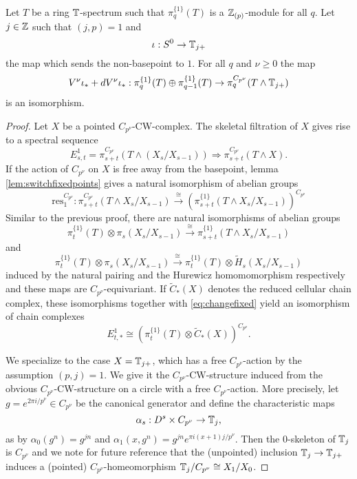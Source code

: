 \begin{lem}
Let $T$ be a ring $\mathbb{T}$-spectrum such that $\pi_q^{\{1\}}(T)$ is a $\mathbb{Z}_{(p)}$-module for all $q$. Let $j\in \mathbb{Z}$ such that $(j,p) = 1$ and 
$$\iota:S^0\rightarrow \mathbb{T}_{j+}$$
the map which sends the non-basepoint to $1$.
For all $q$ and $\nu\ge 0$ the map $$V^\nu \iota_\ast +d V^\nu \iota_\ast :\pi^{\{1\}}_q(T)\oplus \pi^{\{1\}}_{q-1}(T)\rightarrow \pi^{C_{p^\nu}}_q(T\wedge \mathbb{T}_{j+})$$
is an isomorphism.
\end{lem}


\begin{proof}
Let $X$ be a pointed  $C_{p^\nu}$-CW-complex. The skeletal filtration of $X$ gives rise to a spectral sequence
\[
E^1_{s,t}=\pi^{C_{p^\nu}}_{s+t}(T\wedge (X_s/X_{s-1}))
\Rightarrow \pi_{s+t}^{C_{p^\nu}}(T\wedge X).
\]
If the action of $C_{p^\nu}$ on $X$ is free away from the basepoint, 
lemma \ref{lem:switchfixedpoints} gives a natural isomorphism
of abelian groups
\begin{equation}\label{eq:changefixed}
\mathrm{res}^{C_{p^\nu}}_1:\pi^{C_{p^\nu}}_{s+t}(T \wedge X_s/X_{s-1})\xrightarrow{\cong} 
\left(\pi^{\{1\}}_{s+t}(T \wedge X_s/X_{s-1})\right)^{C_{p^\nu}}
\end{equation}
Similar to the previous proof, there are natural isomorphisms
of abelian groups
\[
\pi^{ \{ 1\} }_t(T)\otimes\pi_s(X_s/X_{s-1}) \xrightarrow{\cong}
\pi^{\{1\}}_{s+t}(T\wedge X_s/X_{s-1})
\]
and
\[
\pi^{ \{ 1\} }_t(T)\otimes\pi_s(X_s/X_{s-1}) \xrightarrow{\cong} 
\pi^{ \{ 1\} }_t(T)\otimes \tilde H_s(X_s/X_{s-1})
\]
induced by the natural pairing
and the Hurewicz homomomorphism respectively and these maps
are $C_{p^\nu}$-equivariant. If $\tilde C_\ast(X)$ denotes
the reduced cellular chain complex, these isomorphisms
together with \eqref{eq:changefixed}
 yield an isomorphism of chain complexes
\begin{equation}\label{eq:ffirstpage}
E^1_{t,\ast}\cong \left( \pi^{\{1\}}_t(T)\otimes \tilde C_\ast(X) \right)^{C_{p^\nu}}.
\end{equation}

We specialize to the case $X=\mathbb{T}_{j+}$, which has a free
$C_{p^\nu}$-action by the assumption $(p,j) = 1$. 
We give it the $C_{p^\nu}$-CW-structure induced from the obvious $C_{p^\nu}$-CW-structure
on a circle with a free $C_{p^\nu}$-action. More precisely, let $g=e^{2\pi i/p^\nu}\in C_{p^\nu}$ be the canonical generator
and define the characteristic maps
\[
\alpha_s: D^s\times C_{p^\nu}\to \mathbb{T}_j,
\]
as by $\alpha_0(g^n) = g^{jn} $ and $\alpha_1(x, g^n) = g^{jn} e^{\pi i(x+1)j/p^\nu}$. 
Then the $0$-skeleton of $\mathbb{T}_j$ is $C_{p^\nu}$ and we note for future reference that
the (unpointed) inclusion $\mathbb{T}_j\to \mathbb{T}_{j+}$ induces a (pointed) $C_{p^\nu}$-homeomorphism
$\mathbb{T}_j/C_{p^\nu}\cong X_1/X_0$. 


\end{proof}
